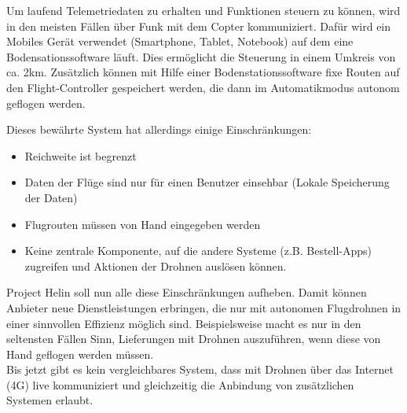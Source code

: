 Um laufend Telemetriedaten zu erhalten und Funktionen steuern zu können, wird in den meisten Fällen über Funk mit dem Copter kommuniziert. Dafür wird ein Mobiles Gerät verwendet (Smartphone, Tablet, Notebook) auf dem eine Bodensationssoftware läuft. Dies ermöglicht die Steuerung in einem Umkreis von ca. 2km. Zusätzlich können mit Hilfe einer Bodenstationssoftware fixe Routen auf den Flight-Controller gespeichert werden, die dann im Automatikmodus autonom geflogen werden.

\newpage
Dieses bewährte System hat allerdings einige Einschränkungen: 

\begin{itemize}
	\item{Reichweite ist begrenzt}
	\item{Daten der Flüge sind nur für einen Benutzer einsehbar (Lokale Speicherung der Daten)}
	\item{Flugrouten müssen von Hand eingegeben werden}
	\item{Keine zentrale Komponente, auf die andere Systeme (z.B. Bestell-Apps) zugreifen und Aktionen der Drohnen auslösen können.}
\end{itemize}

Project Helin soll nun alle diese Einschränkungen aufheben. Damit können Anbieter neue Dienstleistungen erbringen, die nur mit autonomen Flugdrohnen in einer sinnvollen Effizienz möglich sind. Beispielsweise macht es nur in den seltensten Fällen Sinn, Lieferungen mit Drohnen auszuführen, wenn diese von Hand geflogen werden müssen. \\

Bis jetzt gibt es kein vergleichbares System, dass mit Drohnen über das Internet (4G) live kommuniziert und gleichzeitig die Anbindung von zusätzlichen Systemen erlaubt.

